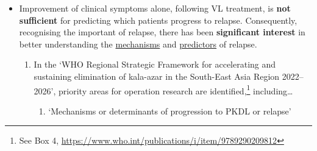 \documentclass[11pt,a4paper]{article} %
\begin{document}
\begin{itemize}
\begin{enumerate}
\begin{enumerate}
                \end{enumerate}
          \item \textbf{Why understated}: relapse rates obtained from prospective clinical trials (e.g.\ \textasciitilde5\%) \textit{underestimate} the disease burden. Why? For a number of reasons\dots
                \begin{enumerate}
                  \item Trial follow-up is typically 6 months, and there is growing evidence that relapse frequently occurs \textit{beyond} 6 months.\footnote{\url{https://doi.org/10.1016/j.lansea.2023.100317}}
                  \item Trial populations are different to real patients: they are overall less unwell with less comorbidities, and are treated under ideal and well-supervised conditions
                  \item Unlike in routine practice, in trial settings a repeat tissue aspirate following treatment is usually performed. Patients with clinical improvement yet with persistent tissue parasites would often be considered initial treatment failures, and rescue treatment initiated.\footnote{Either immediately, or in some trial settings, if the initial aspirate were 1$+$, then treatment would be started only if a repeat tissue aspirate were positive.} In routine clinical practice, these high risk patients with persistent tissue parasites would be discharged from care and any subsequent relapses would be counted.
                \end{enumerate}
        \end{enumerate}
  \item Improvement of clinical symptoms alone, following VL treatment, is \textbf{not sufficient} for predicting which patients progress to relapse. Consequently, recognising the important of relapse, there has been \textbf{significant interest} in better understanding the \underline{mechanisms} and \underline{predictors} of relapse.
        \begin{enumerate}
          \item In the `WHO Regional Strategic Framework for accelerating and sustaining elimination of kala-azar in the South-East Asia Region 2022--2026', priority areas for operation research are identified,\footnote{See Box 4, \url{https://www.who.int/publications/i/item/9789290209812}} including\dots
                \begin{enumerate}
                  \item `Mechanisms or determinants of progression to PKDL or relapse'

\end{enumerate}
\end{enumerate}
\end{itemize}
\end{document}

